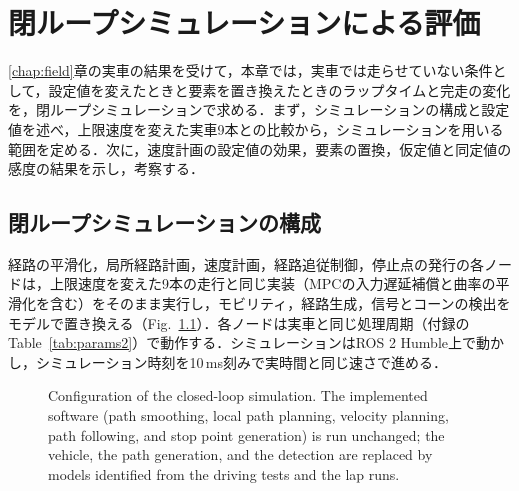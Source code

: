 \chapter{閉ループシミュレーションによる評価}
\label{chap:contribution}
\newcommand{\sscell}[2]{{\renewcommand{\arraystretch}{1}\begin{tabular}[c]{@{}c@{}}#1\\[1pt]#2\end{tabular}}}
\ref{chap:field}章の実車の結果を受けて，本章では，実車では走らせていない条件として，設定値を変えたときと要素を置き換えたときのラップタイムと完走の変化を，閉ループシミュレーションで求める．まず，シミュレーションの構成と設定値を述べ，上限速度を変えた実車9本との比較から，シミュレーションを用いる範囲を定める．次に，速度計画の設定値の効果，要素の置換，仮定値と同定値の感度の結果を示し，考察する．

\section{閉ループシミュレーションの構成}
\label{sec:sil}
経路の平滑化，局所経路計画，速度計画，経路追従制御，停止点の発行の各ノードは，上限速度を変えた9本の走行と同じ実装（MPCの入力遅延補償と曲率の平滑化を含む）をそのまま実行し，モビリティ，経路生成，信号とコーンの検出をモデルで置き換える（Fig.~\ref{fig:sil}）．各ノードは実車と同じ処理周期（付録のTable~\ref{tab:params2}）で動作する．シミュレーションはROS 2 Humble上で動かし，シミュレーション時刻を10\,ms刻みで実時間と同じ速さで進める．

\begin{figure}[H]
  \centering
  
  \caption[Configuration of the closed-loop simulation.]{Configuration of the closed-loop simulation. The implemented software (path smoothing, local path planning, velocity planning, path following, and stop point generation) is run unchanged; the vehicle, the path generation, and the detection are replaced by models identified from the driving tests and the lap runs.}
  \label{fig:sil}
\end{figure}

